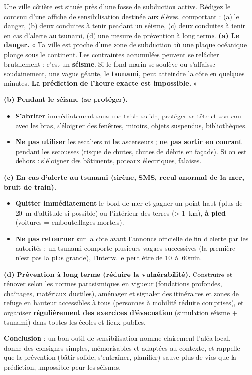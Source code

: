 \documentclass[11pt]{article}
\begin{document}
\begin{exoresolu}
Une ville côtière est située près d'une fosse de subduction active. Rédigez le contenu d'une affiche de sensibilisation destinée aux élèves, comportant : (a) le danger, (b) deux conduites à tenir pendant un séisme, (c) deux conduites à tenir en cas d'alerte au tsunami, (d) une mesure de prévention à long terme.
\tcblower
\textbf{(a) Le danger.} « Ta ville est proche d'une zone de subduction où une plaque océanique plonge sous le continent. Les contraintes accumulées peuvent se relâcher brutalement : c'est un \textbf{séisme}. Si le fond marin se soulève ou s'affaisse soudainement, une vague géante, le \textbf{tsunami}, peut atteindre la côte en quelques minutes. \textbf{La prédiction de l'heure exacte est impossible.} »

\textbf{(b) Pendant le séisme (se protéger).}
\begin{itemize}
\item \textbf{S'abriter} immédiatement sous une table solide, protéger sa tête et son cou avec les bras, s'éloigner des fenêtres, miroirs, objets suspendus, bibliothèques.
\item \textbf{Ne pas utiliser} les escaliers ni les ascenseurs ; \textbf{ne pas sortir en courant} pendant les secousses (risque de chutes, chutes de débris en façade). Si on est dehors : s'éloigner des bâtiments, poteaux électriques, falaises.
\end{itemize}

\textbf{(c) En cas d'alerte au tsunami (sirène, SMS, recul anormal de la mer, bruit de train).}
\begin{itemize}
\item \textbf{Quitter immédiatement} le bord de mer et gagner un point haut (plus de \SI{20}{m} d'altitude si possible) ou l'intérieur des terres (\SI{> 1}{km}), \textbf{à pied} (voitures = embouteillages mortels).
\item \textbf{Ne pas retourner} sur la côte avant l'annonce officielle de fin d'alerte par les autorités : un tsunami comporte plusieurs vagues successives (la première n'est pas la plus grande), l'intervalle peut être de \SI{10}{à 60}{min}.
\end{itemize}

\textbf{(d) Prévention à long terme (réduire la vulnérabilité).} Construire et rénover selon les normes parasismiques en vigueur (fondations profondes, chaînages, matériaux ductiles), aménager et signaler des itinéraires et zones de refuge en hauteur accessibles à tous (personnes à mobilité réduite comprises), et organiser \textbf{régulièrement des exercices d'évacuation} (simulation séisme + tsunami) dans toutes les écoles et lieux publics.

\textbf{Conclusion} : un bon outil de sensibilisation nomme clairement l'aléa local, donne des consignes simples, mémorisables et adaptées au contexte, et rappelle que la prévention (bâtir solide, s'entraîner, planifier) sauve plus de vies que la prédiction, impossible pour les séismes.
\end{exoresolu}
\end{document}
